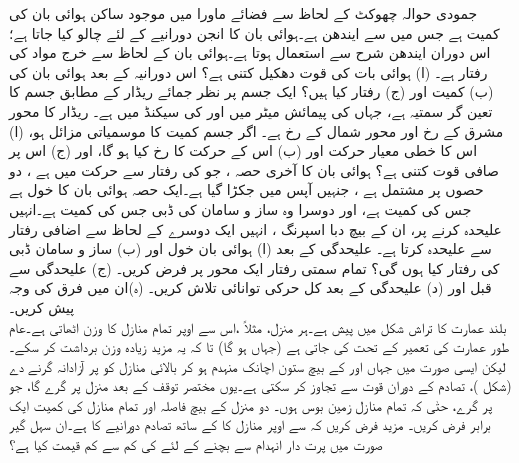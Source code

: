 جمودی حوالہ چھوکٹ کے لحاظ سے   فضائے ماورا میں موجود  ساکن ہوائی بان کی کمیت  ہے جس میں سے  ایندھن ہے۔ہوائی بان کا انجن  دورانیے  کے لئے چالو کیا جاتا ہے؛اس دوران ایندھن  شرح سے  استعمال ہوتا ہے۔ہوائی بان کے لحاظ سے خرج مواد کی رفتار  ہے۔ (ا)  ہوائی بات کی قوت دھکیل کتنی ہے؟  اس دورانیہ کے بعد ہوائی بان کی (ب) کمیت اور (ج) رفتار کیا ہیں؟
ایک جسم  پر نظر جمائے ریڈار کے مطابق جسم کا تعین گر  سمتیہ  ہے، جہاں  کی پیمائش میٹر میں اور  کی سیکنڈ میں ہے۔ ریڈار  کا  محور مشرق کے   رخ  اور  محور شمال   کے رخ ہے۔ اگر  جسم    کمیت کا موسمیاتی  مزائل ہو، (ا) اس کا خطی معیار حرکت اور (ب) اس کے حرکت کا  رخ کیا ہو گا، اور (ج)  اس پر صافی قوت کتنی ہے؟
ہوائی بان کا آخری  حصہ ، جو    کی رفتار سے حرکت میں ہے ، دو حصوں پر مشتمل ہے ، جنہیں  آپس میں جکڑا گیا ہے۔ایک حصہ  ہوائی بان کا  خول   ہے جس کی کمیت  ہے، اور دوسرا  وہ ساز و سامان کی    ڈبی   جس  کی کمیت  ہے۔انہیں علیحدہ کرنے پر، ان کے بیچ دبا اسپرنگ ، انہیں ایک دوسرے کے لحاظ سے اضافی رفتار سے   علیحدہ کرتا ہے۔ علیحدگی کے بعد  (ا) ہوائی بان خول اور (ب) ساز و   سامان  ڈبی کی رفتار کیا ہوں گی؟ تمام سمتی رفتار ایک محور پر  فرض کریں۔ (ج) علیحدگی سے قبل اور (د)  علیحدگی کے بعد  کل حرکی توانائی تلاش کریں۔ (ہ)ان میں    فرق کی وجہ پیش کریں۔
\\
بلند عمارت کا تراش شکل  میں پیش ہے۔ہر منزل، مثلاً  ،اس سے اوپر   تمام منازل کا وزن  اٹھاتی ہے۔عام طور عمارت    کی تعمیر    کے تحت کی  جاتی ہے (جہاں  ہو گا)  تا کہ یہ مزید زیادہ وزن  برداشت کر سکے۔لیکن ایسی صورت میں جہاں  اور  کے بیچ  ستون اچانک منہدم ہو کر بالائی منازل کو پر  آزادانہ  گرنے دے (شکل )،  تصادم کے دوران  قوت   سے تجاوز کر سکتی ہے۔یوں  مختصر توقف کے بعد  منزل  پر گرے گا، جو  پر گرے، حتٰی کہ تمام منازل زمین بوس  ہوں۔  دو منزل کے  بیچ فاصلہ   اور تمام منازل کی کمیت ایک برابر  فرض کریں۔ مزید  فرض کریں کہ  سے اوپر منازل کا  کے ساتھ تصادم  دورانیے کا ہے۔ان  سہل گیر  صورت   میں پرت دار انہدام سے بچنے کے لئے  کی کم سے کم قیمت کیا ہے؟
